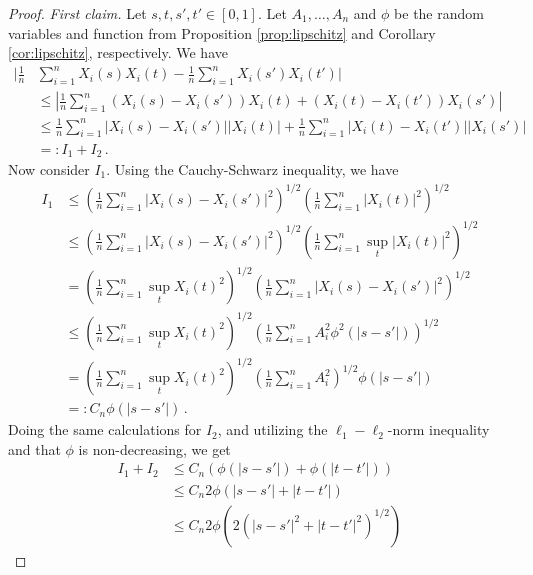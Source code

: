 \begin{proof}
    \emph{First claim.}
    Let $s, t, s', t' \in [0, 1]$. Let $A_1, \dots, A_n$ and $\phi$ be the random
    variables and function from Proposition \ref{prop:lipschitz} and Corollary
    \ref{cor:lipschitz}, respectively. We have
    \begin{align}
        |\frac{1}{n} &\sum_{i = 1}^n X_i(s) X_i(t) - \frac{1}{n} \sum_{i = 1}^n X_i(s') X_i(t')| \\
        &\leq |\frac{1}{n} \sum_{i = 1}^n (X_i(s) - X_i(s')) X_i(t) + (X_i(t) - X_i(t')) X_i(s')| \\
        &\leq \frac{1}{n} \sum_{i = 1}^n |X_i(s) - X_i(s')| |X_i(t)| + \frac{1}{n} \sum_{i = 1}^n |X_i(t) - X_i(t')| |X_i(s')| \\
        &=: I_1 + I_2 \,.
    \end{align}
    Now consider $I_1$. Using the Cauchy-Schwarz inequality, we have
    \begin{align}
        I_1 &\leq \left(\frac{1}{n} \sum_{i = 1}^n |X_i(s) - X_i(s')|^2\right)^{1/2}
        \left(\frac{1}{n} \sum_{i = 1}^n |X_i(t)|^2\right)^{1/2} \\
        &\leq \left(\frac{1}{n} \sum_{i = 1}^n |X_i(s) - X_i(s')|^2\right)^{1/2}
        \left(\frac{1}{n} \sum_{i = 1}^n \sup_t |X_i(t)|^2\right)^{1/2} \\
        &= \left(\frac{1}{n} \sum_{i = 1}^n \sup_t X_i(t)^2\right)^{1/2}
        \left(\frac{1}{n}\sum_{i = 1}^n |X_i(s) - X_i(s')|^2\right)^{1/2} \\
        &\leq \left(\frac{1}{n} \sum_{i = 1}^n \sup_t X_i(t)^2\right)^{1/2}
        \left(\frac{1}{n}\sum_{i = 1}^n A_i^2 \phi^2(|s - s'|)\right)^{1/2} \\
        &= \left(\frac{1}{n} \sum_{i = 1}^n \sup_t X_i(t)^2\right)^{1/2}
        \left(\frac{1}{n}\sum_{i = 1}^n A_i^2 \right)^{1/2} \phi(|s - s'|) \\
        &=: C_n \phi(|s - s'|) \,.
    \end{align}
    Doing the same calculations for $I_2$, and utilizing the $\ell_1-\ell_2$-norm
    inequality and that $\phi$ is non-decreasing, we get
    \begin{align}
        I_1 + I_2 &\leq C_n \left(\phi(|s - s'|) + \phi(|t - t'|)\right) \\
        &\leq C_n 2 \phi(|s - s'| + |t - t'|) \\
        &\leq C_n 2 \phi\left(2(|s - s'|^2 + |t - t'|^2)^{1/2}\right)
    \end{align}


\end{proof}
